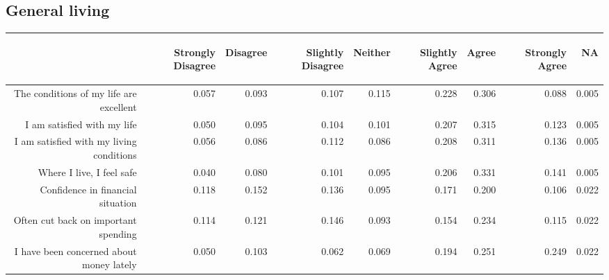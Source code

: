 \documentclass{article}\usepackage[]{graphicx}\usepackage[]{color}
\begin{document}
\subsection{General living}
\begin{table}[ht]
\centering
\begin{tabular}{rrrrrrrrr}
  \hline
 & \begin{sideways} Strongly Disagree \end{sideways} & \begin{sideways} Disagree \end{sideways} & \begin{sideways} Slightly Disagree \end{sideways} & \begin{sideways} Neither \end{sideways} & \begin{sideways} Slightly Agree \end{sideways} & \begin{sideways} Agree \end{sideways} & \begin{sideways} Strongly Agree \end{sideways} & \begin{sideways} NA \end{sideways} \\ 
  \hline
The conditions of my life are excellent & 0.057 & 0.093 & 0.107 & 0.115 & 0.228 & 0.306 & 0.088 & 0.005 \\ 
  I am satisfied with my life & 0.050 & 0.095 & 0.104 & 0.101 & 0.207 & 0.315 & 0.123 & 0.005 \\ 
  I am satisfied with my living conditions & 0.056 & 0.086 & 0.112 & 0.086 & 0.208 & 0.311 & 0.136 & 0.005 \\ 
  Where I live, I feel safe & 0.040 & 0.080 & 0.101 & 0.095 & 0.206 & 0.331 & 0.141 & 0.005 \\ 
  Confidence in financial situation & 0.118 & 0.152 & 0.136 & 0.095 & 0.171 & 0.200 & 0.106 & 0.022 \\ 
  Often cut back on important spending & 0.114 & 0.121 & 0.146 & 0.093 & 0.154 & 0.234 & 0.115 & 0.022 \\ 
  I have been concerned about money lately & 0.050 & 0.103 & 0.062 & 0.069 & 0.194 & 0.251 & 0.249 & 0.022 \\ 
   \hline
\end{tabular}
\end{table}
\end{document}
